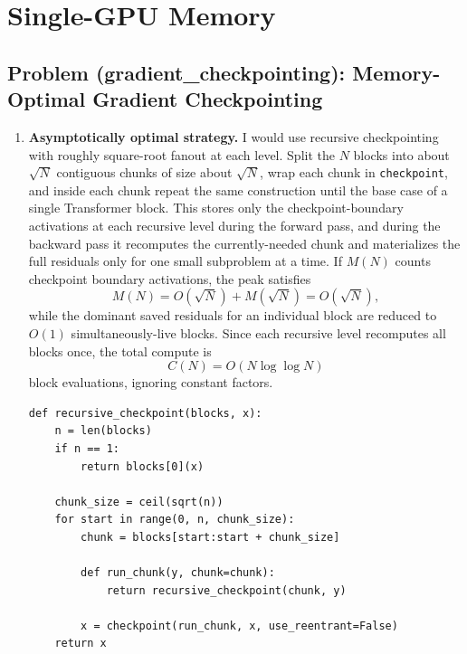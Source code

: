 \documentclass[11pt]{article}
\newcommand{\codepath}[1]{\texttt{#1}}
\begin{document}
\section{Single-GPU Memory}

\subsection{Problem (gradient\_checkpointing): Memory-Optimal Gradient Checkpointing}

\begin{enumerate}
  \item \textbf{Asymptotically optimal strategy.}
  I would use recursive checkpointing with roughly square-root fanout at each level. Split the $N$ blocks into about $\sqrt{N}$ contiguous chunks of size about $\sqrt{N}$, wrap each chunk in \codepath{checkpoint}, and inside each chunk repeat the same construction until the base case of a single Transformer block. This stores only the checkpoint-boundary activations at each recursive level during the forward pass, and during the backward pass it recomputes the currently-needed chunk and materializes the full residuals only for one small subproblem at a time. If $M(N)$ counts checkpoint boundary activations, the peak satisfies
  \[
    M(N) = O(\sqrt{N}) + M(\sqrt{N}) = O(\sqrt{N}),
  \]
  while the dominant saved residuals for an individual block are reduced to $O(1)$ simultaneously-live blocks. Since each recursive level recomputes all blocks once, the total compute is
  \[
    C(N) = O(N \log\log N)
  \]
  block evaluations, ignoring constant factors.

\begin{verbatim}
def recursive_checkpoint(blocks, x):
    n = len(blocks)
    if n == 1:
        return blocks[0](x)

    chunk_size = ceil(sqrt(n))
    for start in range(0, n, chunk_size):
        chunk = blocks[start:start + chunk_size]

        def run_chunk(y, chunk=chunk):
            return recursive_checkpoint(chunk, y)

        x = checkpoint(run_chunk, x, use_reentrant=False)
    return x
\end{verbatim}


\end{enumerate}
\end{document}
